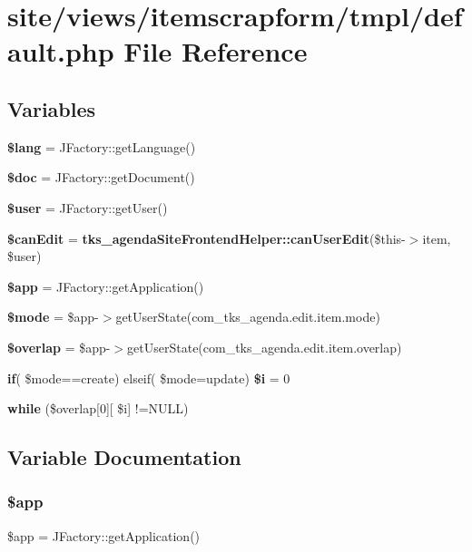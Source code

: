 \section{site/views/itemscrapform/tmpl/default.php File Reference}
\label{site_2views_2itemscrapform_2tmpl_2default_8php}
\subsection*{Variables}
\begin{DoxyCompactItemize}
\item 
\textbf{ \$lang} = J\+Factory\+::get\+Language()
\item 
\textbf{ \$doc} = J\+Factory\+::get\+Document()
\item 
\textbf{ \$user} = J\+Factory\+::get\+User()
\item 
\textbf{ \$can\+Edit} = \textbf{ tks\+\_\+agenda\+Site\+Frontend\+Helper\+::can\+User\+Edit}(\$this-\/$>$item, \$user)
\item 
\textbf{ \$app} = J\+Factory\+::get\+Application()
\item 
\textbf{ \$mode} = \$app-\/$>$get\+User\+State(\textquotesingle{}com\+\_\+tks\+\_\+agenda.\+edit.\+item.\+mode\textquotesingle{})
\item 
\textbf{ \$overlap} = \$app-\/$>$get\+User\+State(\textquotesingle{}com\+\_\+tks\+\_\+agenda.\+edit.\+item.\+overlap\textquotesingle{})
\item 
\textbf{ if}( \$mode==\textquotesingle{}create\textquotesingle{}) elseif( \$mode=\textquotesingle{}update\textquotesingle{}) \textbf{ \$i} = 0
\item 
\textbf{ while} (\$overlap[0][ \$i] !=N\+U\+LL)
\end{DoxyCompactItemize}


\subsection{Variable Documentation}
\mbox{\label{site_2views_2itemscrapform_2tmpl_2default_8php_adfb117f244076aa9bc269269f7e57403}} 
\subsubsection{\$app}
{\footnotesize\ttfamily \$app = J\+Factory\+::get\+Application()}


